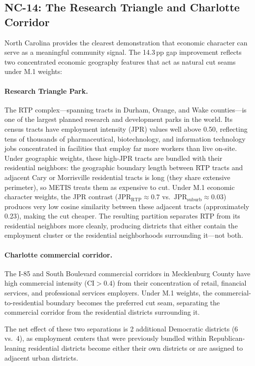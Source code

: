 \subsection{NC-14: The Research Triangle and Charlotte Corridor}

North Carolina provides the clearest demonstration that economic character
can serve as a meaningful community signal.
The 14.3\,pp gap improvement reflects two concentrated economic geography
features that act as natural cut seams under M.1 weights:

\paragraph{Research Triangle Park.}
The RTP complex---spanning tracts in Durham, Orange, and Wake counties---is one
of the largest planned research and development parks in the world.
Its census tracts have employment intensity (JPR) values well above 0.50,
reflecting tens of thousands of pharmaceutical, biotechnology, and information
technology jobs concentrated in facilities that employ far more workers than
live on-site.
Under geographic weights, these high-JPR tracts are bundled with their
residential neighbors: the geographic boundary length between RTP tracts
and adjacent Cary or Morrisville residential tracts is long (they share
extensive perimeter), so METIS treats them as expensive to cut.
Under M.1 economic character weights, the JPR contrast ($\mathrm{JPR}_{\mathrm{RTP}} \approx 0.7$
vs.\ $\mathrm{JPR}_{\mathrm{suburb}} \approx 0.03$) produces very low cosine
similarity between these adjacent tracts (approximately 0.23), making the cut cheaper.
The resulting partition separates RTP from its residential neighbors more cleanly,
producing districts that either contain the employment cluster or the residential
neighborhoods surrounding it---not both.

\paragraph{Charlotte commercial corridor.}
The I-85 and South Boulevard commercial corridors in Mecklenburg County
have high commercial intensity ($\mathrm{CI} > 0.4$) from their concentration
of retail, financial services, and professional services employers.
Under M.1 weights, the commercial-to-residential boundary becomes the preferred
cut seam, separating the commercial corridor from the residential districts
surrounding it.

The net effect of these two separations is 2 additional Democratic districts
(6 vs.\ 4), as employment centers that were previously bundled within
Republican-leaning residential districts become either their own districts
or are assigned to adjacent urban districts.

